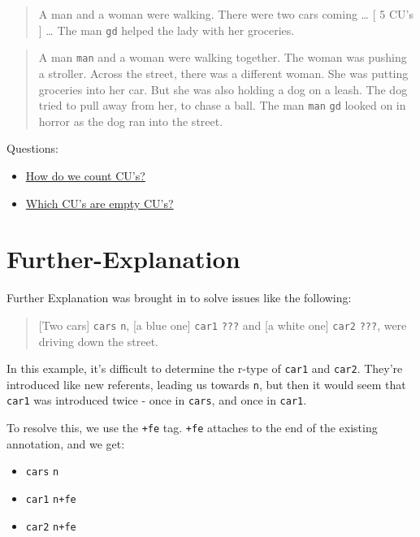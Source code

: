 \documentclass[
]{book}
\providecommand{\tightlist}{%
  \setlength{\itemsep}{0pt}\setlength{\parskip}{0pt}}
\begin{document}
\begin{quote}
A man and a woman were walking.
There were two cars coming \ldots{}
{[} 5 CU's {]} \ldots{}
The man \texttt{gd} helped the lady with her groceries.
\end{quote}

\begin{quote}
A man \texttt{man} and a woman were walking together.
The woman was pushing a stroller.
Across the street, there was a different woman.
She was putting groceries into her car.
But she was also holding a dog on a leash.
The dog tried to pull away from her, to chase a ball.
The man \texttt{man} \texttt{gd} looked on in horror as the dog ran into the street.
\end{quote}

Questions:

\begin{itemize}
\tightlist
\item
  \protect\hyperlink{counting-cus}{How do we count CU's?}
\item
  \protect\hyperlink{empty-cus}{Which CU's are empty CU's?}
\end{itemize}

\hypertarget{further-explanation}{%
\section{Further-Explanation}\label{further-explanation}}

Further Explanation was brought in to solve issues like the following:

\begin{quote}
{[}Two cars{]} \texttt{cars} \texttt{n}, {[}a blue one{]} \texttt{car1} \texttt{???} and {[}a white one{]} \texttt{car2} \texttt{???}, were driving down the street.
\end{quote}

In this example, it's difficult to determine the r-type of \texttt{car1} and \texttt{car2}.
They're introduced like new referents, leading us towards \texttt{n}, but then it would seem that \texttt{car1} was introduced twice -
once in \texttt{cars}, and once in \texttt{car1}.

To resolve this, we use the \texttt{+fe} tag.
\texttt{+fe} attaches to the end of the existing annotation, and we get:

\begin{itemize}
\tightlist
\item
  \texttt{cars} \texttt{n}
\item
  \texttt{car1} \texttt{n+fe}
\item
  \texttt{car2} \texttt{n+fe}
\end{itemize}
\end{document}
